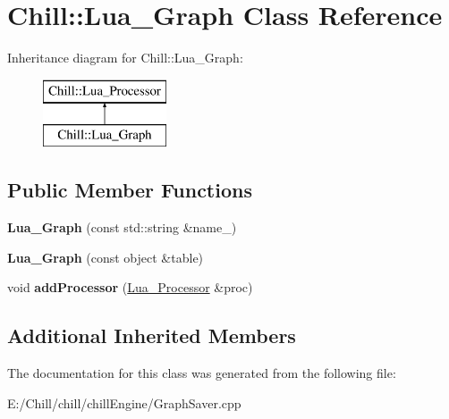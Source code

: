 \hypertarget{class_chill_1_1_lua___graph}{}\section{Chill\+:\+:Lua\+\_\+\+Graph Class Reference}
\label{class_chill_1_1_lua___graph}
Inheritance diagram for Chill\+:\+:Lua\+\_\+\+Graph\+:\begin{figure}[H]
\begin{center}
\leavevmode
\includegraphics[height=2.000000cm]{class_chill_1_1_lua___graph}
\end{center}
\end{figure}
\subsection*{Public Member Functions}
\begin{DoxyCompactItemize}
\item 
\mbox{\label{class_chill_1_1_lua___graph_a9c6f01507d4ea76b9f5cf0cb6e7cd3e6}} 
{\bfseries Lua\+\_\+\+Graph} (const std\+::string \&name\+\_\+)
\item 
\mbox{\label{class_chill_1_1_lua___graph_a47fa0453dab0cb95842374ddf9da1661}} 
{\bfseries Lua\+\_\+\+Graph} (const object \&table)
\item 
\mbox{\label{class_chill_1_1_lua___graph_adef0f02440498754dc11efa2e3318d84}} 
void {\bfseries add\+Processor} (\mbox{\hyperlink{class_chill_1_1_lua___processor}{Lua\+\_\+\+Processor}} \&proc)
\end{DoxyCompactItemize}
\subsection*{Additional Inherited Members}


The documentation for this class was generated from the following file\+:\begin{DoxyCompactItemize}
\item 
E\+:/\+Chill/chill/chill\+Engine/Graph\+Saver.\+cpp\end{DoxyCompactItemize}
